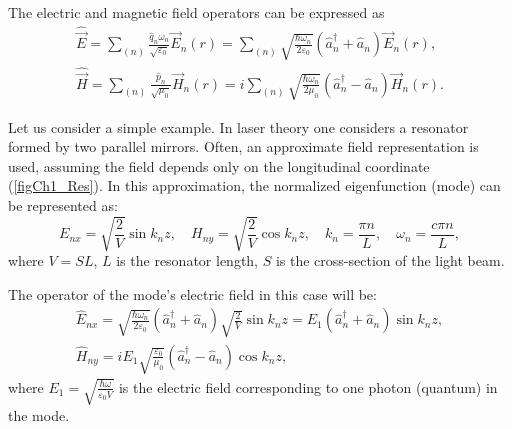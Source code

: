 The electric and magnetic field operators can be expressed as
\begin{eqnarray}
\hat{\vec{E}} = \sum_{(n)}\frac{\hat{q}_n
  \omega_n}{\sqrt{\varepsilon_0}} \vec{E}_n\left(r\right) = 
\sum_{(n)}\sqrt{\frac{\hbar \omega_n}{2 \varepsilon_0}}
\left(\hat{a}_n^{\dag} + \hat{a}_n \right)
\vec{E}_n\left(r\right),
\nonumber \\
\hat{\vec{H}} = \sum_{(n)}\frac{\hat{p}_n}
{\sqrt{\mu_0}} \vec{H}_n\left(r\right) = 
i \sum_{(n)}\sqrt{\frac{\hbar \omega_n}{2 \mu_0}}
\left(\hat{a}_n^{\dag} - \hat{a}_n \right)
\vec{H}_n\left(r\right).
\end{eqnarray}

Let us consider a simple example. In laser theory one considers a resonator
formed by two parallel mirrors. Often, an approximate field representation
is used, assuming the field depends only on the longitudinal coordinate (\autoref{figCh1_Res}). In
this approximation, the normalized eigenfunction (mode) can be
represented as:
\begin{equation}
E_{nx} = \sqrt{\frac{2}{V}} \sin k_n z,
\quad
H_{ny} = \sqrt{\frac{2}{V}} \cos k_n z,
\quad
k_n = \frac{\pi n}{L},
\quad
\omega_n = \frac{c \pi n}{L},
\end{equation}
where  $V = SL$,  $L$ is the resonator length,  $S$ is the cross-section of the light beam.



The operator of the mode's electric field in this case will be:
\begin{eqnarray}
\hat{E}_{nx} = 
\sqrt{\frac{\hbar \omega_n}{2 \varepsilon_0}}
\left(\hat{a}_n^{\dag} + \hat{a}_n \right)
\sqrt{\frac{2}{V}} \sin k_n z = 
E_1 \left(\hat{a}_n^{\dag} + \hat{a}_n \right) \sin k_n z, 
\nonumber \\
\hat{H}_{ny} = i E_1 \sqrt{\frac{\varepsilon_0}{\mu_0}}
\left(\hat{a}_n^{\dag} - \hat{a}_n \right) \cos k_n z,
\label{eqCh1_EH_simple}
\end{eqnarray}
where
$E_1 = \sqrt{\frac{\hbar \omega}{\varepsilon_0 V}}$ is the
electric field corresponding to one photon (quantum) in
the mode. 
